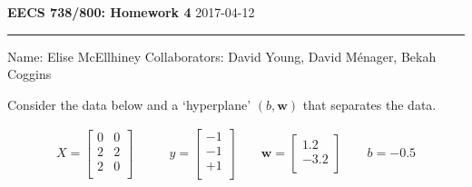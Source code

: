 \documentclass[]{exam} %
\begin{document}
\noindent\textbf{\large{EECS 738/800: Homework 4}} \hfill 2017-04-12
\smallskip
\hrule 
\bigskip
Name: Elise McEllhiney \qquad
Collaborators: David Young, David M\'enager, Bekah Coggins

\bigskip
\medskip

\begin{questions} %
\question Consider the data below and a `hyperplane' $(b, \mathbf{w})$ that
separates the data.

\begin{align*}
   X = 
  \begin{bmatrix} 
  0 & 0 \\
  2 & 2 \\
  2 & 0 \\
  \end{bmatrix} 
  \hspace{2em}
   &y = 
  \begin{bmatrix} 
  -1 \\
  -1 \\
  +1 \\
  \end{bmatrix} 
  \hspace{2em}
   \mathbf{w} = 
  \begin{bmatrix} 
  1.2  \\
  -3.2 \\
  \end{bmatrix} 
  \hspace{2em}
  b = -0.5
\end{align*}
\end{questions}
\end{document}
